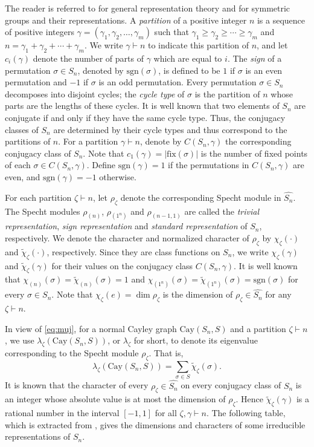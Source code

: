 \documentclass[12pt, a4paper]{article}
\def\fix{\mathrm{fix}}
\theoremstyle{definition}
\begin{document}
The reader is referred to \cite{I,JL,S1,S} for general representation theory and \cite{Sagan} for symmetric groups and their representations. A \emph{partition} of a positive integer $n$ is a sequence of positive integers $\gamma=(\gamma_1,\gamma_2,\ldots,\gamma_m)$ such that $\gamma_1\ge \gamma_2\ge\cdots\ge\gamma_m$ and $n=\gamma_1+\gamma_2+\cdots+\gamma_m$. We write $\gamma \vdash n$ to indicate this partition of $n$, and let $c_{i}(\gamma)$ denote the number of parts of $\gamma$ which are equal to $i$. The \emph{sign} of a permutation $\sigma\in S_n$, denoted by $\mathrm{sgn}(\sigma)$, is defined to be $1$ if $\sigma$ is an even permutation and $-1$ if $\sigma$ is an odd permutation. Every permutation $\sigma\in S_n$ decomposes into disjoint cycles; the \emph{cycle type} of $\sigma$ is the partition of $n$ whose parts are the lengths of these cycles. It is well known that two elements of $S_n$ are conjugate if and only if they have the same cycle type. Thus, the conjugacy classes of $S_n$ are determined by their cycle types and thus correspond to the partitions of $n$. For a partition $\gamma\vdash n$, denote by $C(S_n,\gamma)$ the corresponding conjugacy class of $S_n$. Note that $c_{1}(\gamma) = |\fix(\sigma)|$ is the number of fixed points of each $\sigma \in C(S_n,\gamma)$. Define $\mathrm{sgn}(\gamma)=1$ if the permutations in $C(S_n,\gamma)$ are even, and $\mathrm{sgn}(\gamma)=-1$ otherwise. 

For each partition $\zeta\vdash n$, let $\rho_\zeta$ denote the corresponding Specht module in $\widehat{S_n}$. The Specht modules $\rho_{(n)}$, $\rho_{(1^n)}$ and $\rho_{(n-1,1)}$ are called the \emph{trivial representation}, \emph{sign representation} and \emph{standard representation} of $S_n$, respectively. We denote the character and normalized character of $\rho_\zeta$ by $\chi_\zeta(\cdot)$ and $\tilde{\chi}_\zeta(\cdot)$, respectively. Since they are class functions on $S_n$, we write $\chi_\zeta(\gamma)$ and $\tilde{\chi}_\zeta(\gamma)$ for their values on the conjugacy class $C(S_n,\gamma)$.  It is well known that $\chi_{(n)}(\sigma)=\tilde{\chi}_{(n)}(\sigma)=1$ and $\chi_{(1^n)}(\sigma)=\tilde{\chi}_{(1^n)}(\sigma)=\mathrm{sgn}(\sigma)$ for every $\sigma\in S_n$. Note that $\chi_\zeta(e)=\dim\rho_{\zeta}$ is the dimension of $\rho_\zeta\in \widehat{S_n}$ for any $\zeta\vdash n$.

In view of \eqref{eq:muj}, for a normal Cayley graph $\mathrm{Cay}(S_n, S)$ and a partition $\zeta \vdash n$, we use $\lambda_\zeta(\mathrm{Cay}(S_n, S))$, or $\lambda_\zeta$ for short, to denote its eigenvalue corresponding to the Specht module $\rho_\zeta$. That is,
\begin{equation}\label{eq:eigen-chara}
    \lambda_\zeta(\mathrm{Cay}(S_n, S)) = \sum_{\sigma \in S} \tilde{\chi}_\zeta(\sigma).
\end{equation}
It is known \cite{F} that the character of every $\rho_\zeta\in \widehat{S_n}$ on every conjugacy class of $S_n$ is an integer whose absolute value is at most the dimension of $\rho_\zeta$. Hence $\tilde{\chi}_\zeta(\gamma)$ is a rational number in the interval $[-1,1]$ for all $\zeta,\gamma\vdash n$.  The following table, which is extracted from \cite[Table 1]{PP}, gives the dimensions and characters of some irreducible representations of $S_n$.
\end{document}
